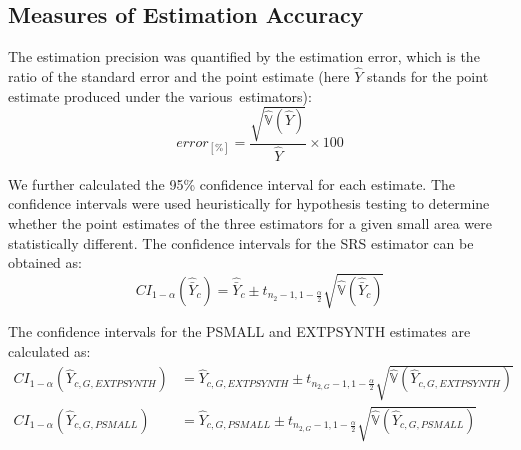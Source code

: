 \documentclass[remotesensing,article,accept,moreauthors,pdftex,10pt,a4paper]{Definitions/mdpi}
\newcommand{\psmall}{PSMALL}
\newcommand{\extpsynth}{EXTPSYNTH}
\newcommand{\var}{\mathbb{V}}
\begin{document}
\subsection{Measures of Estimation Accuracy}

The estimation precision was quantified by the estimation error, which is the ratio of the standard error and the point estimate (here $\hat{Y}$ stands for the point estimate produced under the various~estimators):
\begin{equation}\label{eq:error}
error_{[\%]} = \frac{\sqrt{\hat{\var}(\hat{Y})}}{\hat{Y}} \times 100
\end{equation}

We further calculated the 95\% confidence interval for each estimate. The confidence intervals were used heuristically for hypothesis testing to determine whether the point estimates of the three estimators for a given small area were statistically different. The confidence intervals for the SRS estimator can be obtained as:
\begin{equation}\label{ci_1phase}
CI_{1-\alpha}(\hat{\bar{Y}}_c) = \hat{\bar{Y}}_c \pm t_{n_{2}-1, 1-\frac{\alpha}{2}}\sqrt{\hat{\var}(\hat{\bar{Y}}_c)}
\end{equation}


The confidence intervals for the \psmall{} and \extpsynth{} estimates are calculated as:
\begin{subequations}\label{ci_2phase_sae}
	\begin{align}
	CI_{1-\alpha}(\hat{Y}_{c,G,EXTPSYNTH})& = \hat{Y}_{c,G,EXTPSYNTH} \pm t_{n_{2,G}-1, 1-\frac{\alpha}{2}}\sqrt{\hat{\var}(\hat{Y}_{c,G,EXTPSYNTH})} \\
	CI_{1-\alpha}(\hat{Y}_{c,G,PSMALL})& = \hat{Y}_{c,G,PSMALL} \pm t_{n_{2,G}-1, 1-\frac{\alpha}{2}}\sqrt{\hat{\var}(\hat{Y}_{c,G,PSMALL})}
	\end{align}
\end{subequations}
\end{document}
